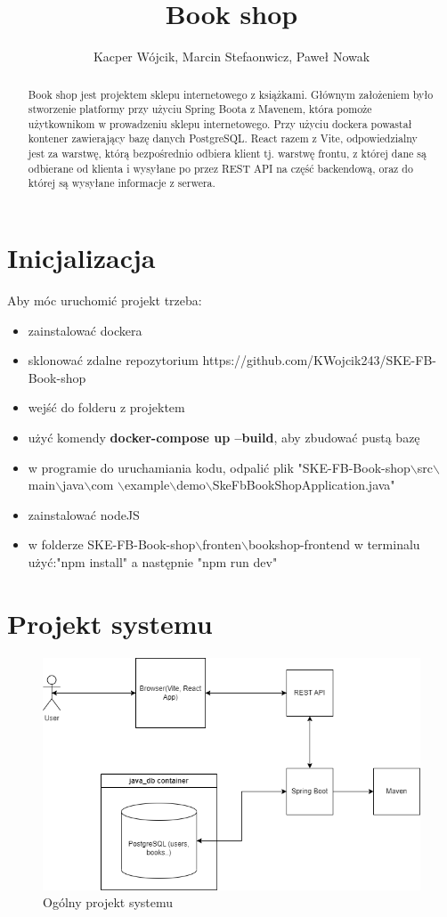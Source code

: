 \documentclass[]{article}
\title{Book shop}
\author{Kacper Wójcik, Marcin Stefaonwicz, Paweł Nowak}
\begin{document}
\maketitle

\begin{abstract}
	Book shop jest projektem sklepu internetowego z książkami. Głównym założeniem było stworzenie platformy przy użyciu Spring Boota z Mavenem, która pomoże użytkownikom w prowadzeniu sklepu internetowego. Przy użyciu dockera powastał kontener zawierający bazę danych PostgreSQL. React razem z Vite, odpowiedzialny jest za warstwę, którą bezpośrednio odbiera klient tj. warstwę frontu, z której dane są odbierane od klienta i wysyłane po przez REST API na część backendową, oraz do której są wysyłane informacje z serwera.

\end{abstract}
\section* {Inicjalizacja}
Aby móc uruchomić projekt trzeba:
\begin{itemize}
	\item zainstalować dockera
	\item sklonować zdalne repozytorium https://github.com/KWojcik243/SKE-FB-Book-shop
	\item wejść do folderu z projektem
	\item użyć komendy \textbf{docker-compose up --build}, aby zbudować pustą bazę
	\item w programie do uruchamiania kodu, odpalić plik "SKE-FB-Book-shop$\backslash$src$\backslash$main$\backslash$java$\backslash$com $\backslash$example$\backslash$demo$\backslash$SkeFbBookShopApplication.java"
	\item zainstalować nodeJS
	\item w folderze SKE-FB-Book-shop$\backslash$fronten$\backslash$bookshop-frontend w terminalu użyć:"npm install" a następnie "npm run dev"
\end{itemize}

\newpage

\section{Projekt systemu}
\begin{figure}[h]
	\centering
	\includegraphics[scale=0.45]{ogolny_projekt.png}
	\caption{Ogólny projekt systemu}
\end{figure}
\end{document}
